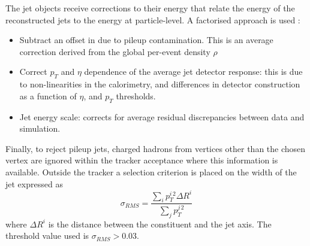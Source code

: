 The jet objects receive corrections to their energy that relate the energy of the reconstructed jets to the energy at particle-level. A factorised approach is used \cite{JetPerformance}:
\begin{itemize}[noitemsep]
    \item Subtract an offset in \pt due to pileup contamination. This is an average correction derived from the global per-event density $\rho$
    \item Correct $p_{T}$ and $\eta$ dependence of the average jet detector response: this is due to non-linearities in the calorimetry, and differences in detector construction as a function of $\eta$, and $p_{T}$ thresholds.
    \item Jet energy scale: corrects for average residual discrepancies between data and simulation.
\end{itemize}

Finally, to reject pileup jets, charged hadrons from vertices other than the chosen vertex are ignored within the tracker acceptance where this information is available. Outside the tracker a selection criterion is placed on the width of the jet expressed as
\begin{equation}
    \sigma_{RMS} = \frac{\sum_{i}p_{T}^{i\,2}\Delta{R}^{i}}{\sum_{j}p_{T}^{j\,2}}
\end{equation}
where $\Delta{R}^{i}$ is the distance between the constituent and the jet axis. The threshold value used is $\sigma_{RMS} > 0.03$. 



